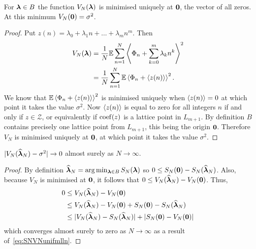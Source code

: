 \documentclass[journal]{IEEEtran}
\begin{document}
\begin{lemma}\label{lem:ES_Nminimisedzero}
For $\boldsymbol{\lambda} \in B$ the function $V_N(\boldsymbol{\lambda})$ is minimised uniquely at $\boldsymbol{0}$, the vector of all zeros.  At this minimum $V_N(\boldsymbol{0}) = \sigma^2$.
\end{lemma}
\begin{proof}
Put $z(n) = \lambda_0 + \lambda_1 n + \dots + \lambda_m n^m$.  Then
\begin{align*}
V_N(\boldsymbol{\lambda}) &= \frac{1}{N}{\mathbb E}\sum_{n=1}^{N}\left\langle  \Phi_n + \sum_{k=0}^m{\lambda_k n^k}  \right\rangle^2 \\
&= \frac{1}{N}\sum_{n=1}^{N}{\mathbb E}\left\langle  \Phi_n + \left\langle z(n) \right\rangle  \right\rangle^2.
\end{align*}
We know that ${\mathbb E}\left\langle  \Phi_n + \left\langle z(n) \right\rangle  \right\rangle^2$ is minimised uniquely when $\left\langle z(n) \right\rangle = 0$ at which point it takes the value $\sigma^2$. Now $\left\langle z(n) \right\rangle$ is equal to zero for all integers $n$ if and only if $z \in \mathcal{Z}$, or equivalently if $\operatorname{coef}(z)$ is a lattice point in $L_{m+1}$. By definition $B$ contains precisely one lattice point from $L_{m+1}$, this being the origin $\boldsymbol{0}$. Therefore $V_N$ is minimised uniquely at $\boldsymbol{0}$, at which point it takes the value $\sigma^2$.
\end{proof}

\begin{lemma} \label{lem:ESNconv}
$\vert V_N(\widehat{\boldsymbol{\lambda}}_N) - \sigma^2 \vert \rightarrow 0$ almost surely as $N \rightarrow \infty$.
\end{lemma}
\begin{proof}
By definition $\widehat{\boldsymbol{\lambda}}_N =\arg\min_{\boldsymbol{\lambda}\in B} S_N(\boldsymbol{\lambda})$ so $0 \leq S_{N}(\boldsymbol{0}) - S_N(\widehat{\boldsymbol{\lambda}}_N)$.  Also, because $V_N$ is minimised at $\boldsymbol{0}$, it follows that $0 \leq V_N(\widehat{\boldsymbol{\lambda}}_N) - V_N(\boldsymbol{0})$.  Thus,
\begin{align*}
0 &\leq V_N(\widehat{\boldsymbol{\lambda}}_N) - V_N(\boldsymbol{0}) \\
 &\leq V_N(\widehat{\boldsymbol{\lambda}}_N) - V_N(\boldsymbol{0}) + S_{N}(\boldsymbol{0}) - S_N(\widehat{\boldsymbol{\lambda}}_N)   \\
&\leq \vert  V_N(\widehat{\boldsymbol{\lambda}}_N) - S_N(\widehat{\boldsymbol{\lambda}}_N)  \vert + \vert  S_{N}(\boldsymbol{0}) - V_N(\boldsymbol{0})  \vert
\end{align*}
which converges almost surely to zero as $N\rightarrow\infty$ as a result of~\eqref{eq:SNVNunifmlln}.
\end{proof}
\end{document}
